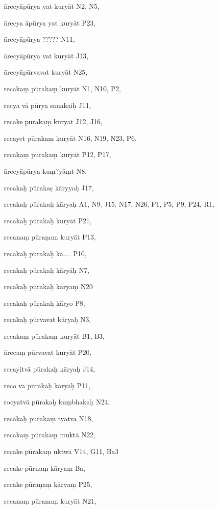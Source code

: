 \begin{ekdosis}
\begin{marma}[hp01_055]
\begin{marma}[hp02_009]
\begin{marma}[hp02_011]
\begin{marma}[hp02_69a]
\begin{description}
    \end{description}
 \end{marma}

\begin{marma}[hp02_73a]
\item[ārecyāpūrya yat kuryāt] N2, N5, 
\item[ārecya āpūrya yat kuryāt] P23,
\item[ārecyāpūrya ?????] N11, 
\item[ārecyāpūrya vat kuryāt] J13,
\item[ārecyāpūrvavat kuryāt] N25,
\item[recakaṃ pūrakaṃ kuryāt] N1, N10, P2, 
\item[recya vā pūrya sanakaiḥ] J11,
\item[recake pūrakaṃ kuryāt] J12, J16, 
\item[recayet pūrakaṃ kuryāt] N16, N19, N23, P6, 
\item[recakaṃ pūrakaṃ kuryāt] P12, P17, 
\item[ārecyāpūrya kuṃ?yāṃt] N8,
\item[recakaḥ pūrakaṣ kāryyaḥ] J17,
\item[recakaḥ pūrakaḥ kāryaḥ] A1, N9, J15, N17, N26, P1, P5, P9, P24, R1, 
\item[recakaḥ pūrakaḥ kuryāt] P21, 
\item[recanaṃ pūraṇam kuryāt] P13,
\item[recakaḥ pūrakaḥ kā....] P10,
\item[recakaḥ pūrakaḥ kāryāḥ] N7, 
\item[recakaḥ pūrakaḥ kāryaṃ] N20
\item[recakaḥ pūrakaḥ kāryo] P8, 
\item[recakaḥ pūrvavat kāryaḥ] N3, 
\item[recakaṃ pūrakaṃ kuryāt] B1, B3, 
\item[ārecaṃ pūrvavat kuryāt] P20,
\item[recayitvā pūrakaḥ kāryaḥ] J14, 
\item[reco vā pūrakaḥ kāryaḥ] P11, 
\item[rocyatvā pūrakaḥ kuṃbhakaḥ] N24,
\item[recakaḥ pūrakaṃ tyatvā] N18, 
\item[recakaṃ pūrakaṃ muktā] N22,
\item[recake pūrakaṃ uktwā] V14, G11, Ba3
\item[recake pūrṇaṃ kāryaṃ] Ba,
\item[recake pūraṇaṃ kāryaṃ] P25,
\item[recanaṃ pūranaṃ kuryāt] N21,

\end{marma}
\end{marma}
\end{marma}
\end{marma}
\end{ekdosis}
